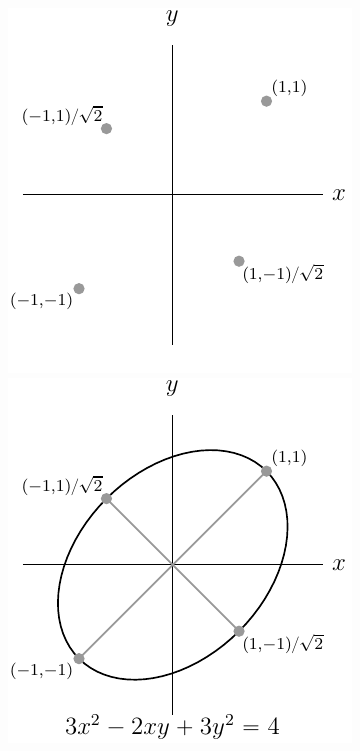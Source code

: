\begin{eg}
\begin{efig}
\begin{center}
   \includegraphics{lagrangeCC}\qquad
   \includegraphics{lagrangeC}
\end{center}
\end{efig}



\end{eg}

